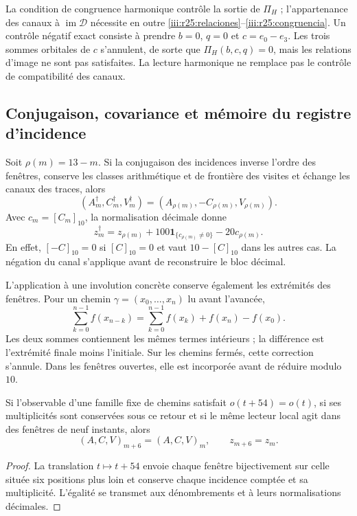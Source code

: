 La condition de congruence harmonique contrôle la sortie de $\Pi_H$ ;
l’appartenance des canaux à $\operatorname{im}\mathcal D$
nécessite en outre \eqref{iii:r25:relaciones}--\eqref{iii:r25:congruencia}.
Un contrôle négatif exact consiste à prendre $b=0$, $q=0$ et
$c=e_0-e_3$. Les trois sommes orbitales de $c$ s’annulent, de sorte
que $\Pi_H(b,c,q)=0$, mais les relations d’image ne sont pas satisfaites.
La lecture harmonique ne remplace pas le contrôle de compatibilité des
canaux.

\subsection{Conjugaison, covariance et mémoire du registre d’incidence}
\label{iii:r25:transporte}

Soit $\rho(m)=13-m$. Si la conjugaison des incidences inverse
l’ordre des fenêtres, conserve les classes arithmétique et de frontière
des visites et échange les canaux des traces, alors
\[
 (A_m^\dagger,C_m^\dagger,V_m^\dagger)
 =(A_{\rho(m)},-C_{\rho(m)},V_{\rho(m)}).
\]
Avec $c_m=[C_m]_{10}$, la normalisation décimale donne
\begin{equation}
 z_m^\dagger=z_{\rho(m)}
 +100\mathbf1_{\{c_{\rho(m)}\ne0\}}-20c_{\rho(m)}.
 \label{iii:r25:conjugacion}
\end{equation}
En effet, $[-C]_{10}=0$ si $[C]_{10}=0$ et vaut
$10-[C]_{10}$ dans les autres cas. La négation du canal
s’applique avant de reconstruire le bloc décimal.

L’application à une involution concrète conserve également les
extrémités des fenêtres. Pour un chemin
$\gamma=(x_0,\ldots,x_n)$ lu avant l’avancée,
\begin{equation}
 \sum_{k=0}^{n-1}f(x_{n-k})
 =\sum_{k=0}^{n-1}f(x_k)+f(x_n)-f(x_0).
 \label{iii:r25:extremos}
\end{equation}
Les deux sommes contiennent les mêmes termes intérieurs ; la différence
est l’extrémité finale moins l’initiale. Sur les chemins fermés, cette
correction s’annule. Dans les fenêtres ouvertes, elle est incorporée avant de
réduire modulo $10$.

\begin{proposition}
\label{iii:r25:periodo}
Si l’observable d’une famille fixe de chemins satisfait
$o(t+54)=o(t)$, si ses multiplicités sont conservées sous ce retour
et si le même lecteur local agit dans des fenêtres de neuf instants,
alors
\[
 (A,C,V)_{m+6}=(A,C,V)_m,\qquad z_{m+6}=z_m.
\]
\end{proposition}
\begin{proof}
La translation $t\mapsto t+54$ envoie chaque fenêtre bijectivement
sur celle située six positions plus loin et conserve chaque incidence
comptée et sa multiplicité. L’égalité se transmet aux dénombrements
et à leurs normalisations décimales.
\end{proof}


